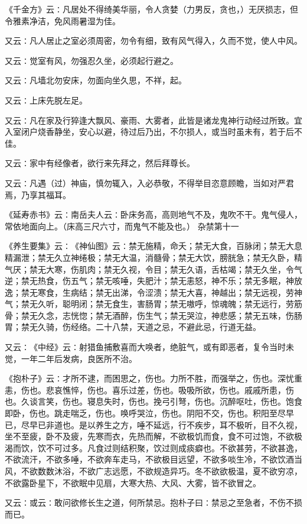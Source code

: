 \documentclass[a4paper,12pt,UTF8,twoside]{ctexbook}
\begin{document}
《千金方》云∶凡居处不得绮美华丽，令人贪婪（力男反，贪也，）无厌损志，但令雅素净洁，免风雨暑湿为佳。

又云∶凡人居止之室必须周密，勿令有细，致有风气得入，久而不觉，使人中风。

又云∶觉室有风，勿强忍久坐，必须起行避之。

又云∶凡墙北勿安床，勿面向坐久思，不祥，起。

又云∶上床先脱左足。

又云∶凡在家及行猝逢大飘风、豪雨、大雾者，此皆是诸龙鬼神行动经过所致。宜入室闭户烧香静坐，安心以避，待过后乃出，不尔损人，或当时虽未有，若于后不佳。

又云∶家中有经像者，欲行来先拜之，然后拜尊长。

又云∶凡遇（过）神庙，慎勿辄入，入必恭敬，不得举目恣意顾瞻，当如对严君焉，乃享其福耳。

《延寿赤书》云∶南岳夫人云∶卧床务高，高则地气不及，鬼吹不干。鬼气侵人，常依地面向上。（床高三尺六寸，而鬼气不能及也。）
杂禁第十一

《养生要集》云∶《神仙图》云∶禁无施精，命夭；禁无大食，百脉闭；禁无大息精漏泄；禁无久立神绻极；禁无大温，消髓骨；禁无大饮，膀胱急；禁无久卧，精气厌；禁无大寒，伤肌肉；禁无久视，令目；禁无久语，舌枯竭；禁无久坐，令气逆；禁无热食，伤五气；禁无咳唾，失肥汁；禁无恚怒，神不乐；禁无多眠，神放逸；禁无寒食，生病结；禁无出涕，令涩溃；禁无大喜，神越出；禁无远视，劳神气；禁无久听，聪明闭；禁无食生，害肠胃；禁无嗷呼，惊魂魄；禁无远行，劳筋骨；禁无久念，志恍惚；禁无酒醉，伤生气；禁无哭泣，神悲感；禁无五味，伤肠胃；禁无久骑，伤经络。二十八禁，天道之忌，不避此忌，行道无益。

又云∶《中经》云∶射猎鱼捕敷喜而大唤者，绝脏气，或有即恶者，复令当时未觉，一年二年后发病，良医所不治。

《抱朴子》云∶才所不逮，而困思之，伤也。力所不胜，而强举之，伤也。深忧重恚，伤也。悲哀憔悴，伤也。喜乐过差，伤也。吸吸所欲，伤也。戚戚所患，伤也。久谈言笑，伤也。寝息失时，伤也。挽弓引弩，伤也。沉醉呕吐，伤也。饱食即卧，伤也。跳走喘乏，伤也。唤呼哭泣，伤也。阴阳不交，伤也。积阳至尽早已，尽早已非道也。是以养生之方，唾不延远，行不疾步，耳不极听，目不久视，坐不至疲，卧不及疲，先寒而衣，先热而解，不欲极饥而食，食不可过饱，不欲极渴而饮，饮不可过多。凡食过则结积聚，饮过则成痰癖也。不欲甚劳，不欲甚逸，不欲流汗，不欲多唾，不欲奔车走马，不欲极目远望，不欲多啖生冷，不欲饮酒当风，不欲数数沐浴，不欲广志远愿，不欲规造异巧。冬不欲欲极温，夏不欲穷凉，不欲露卧星下，不欲眠中见扇，大寒大热、大风、大雾，皆不欲冒之。

又云∶或云∶敢问欲修长生之道，何所禁忌。抱朴子曰∶禁忌之至急者，不伤不损而已。
\end{document}
